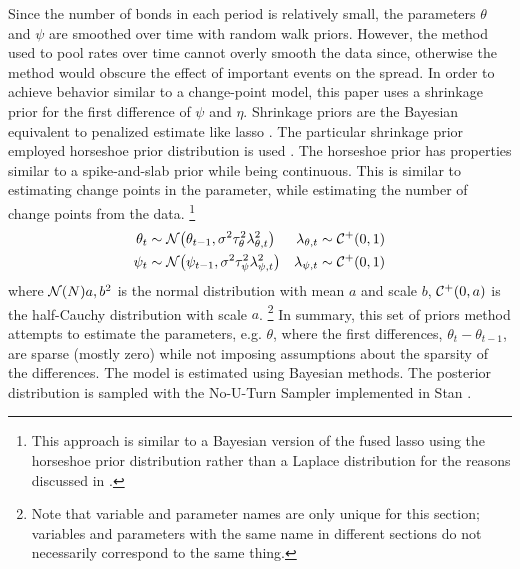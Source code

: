 Since the number of bonds in each period is relatively small, the parameters $\theta$ and $\psi$ are smoothed over time with random walk priors.
However, the method used to pool rates over time cannot overly smooth the data since, otherwise the method would obscure the effect of important events on the spread.
In order to achieve behavior similar to a change-point model, this paper uses a shrinkage prior for the first difference of $\psi$ and $\eta$.
Shrinkage priors are the Bayesian equivalent to penalized estimate like lasso \parencites{Tibshirani1996}{ParkCasella2008}.
The particular shrinkage prior employed horseshoe prior distribution is used \parencites{CarvalhoPolsonScott2009}{CarvalhoPolsonScott2009}.
The horseshoe prior has properties similar to a spike-and-slab prior while being continuous.
This is similar to estimating change points in the parameter, while estimating the number of change points from the data.
\footnote{This approach is similar to a Bayesian version of the fused lasso \textcite{TibshiraniEtAl2005} using the horseshoe prior distribution rather than a Laplace distribution for the reasons discussed in \parencites{CarvalhoPolsonScott2009}{CarvalhoPolsonScott2009}.}
\begin{align}
  \theta_{t} & \sim \mathcal{N}\mathopen{}\left(\theta_{t-1}, \sigma^{2} \tau_{\theta}^{2} \lambda_{\theta,t}^{2}\right)\mathclose{}
  & \lambda_{\theta,t} & \sim \mathcal{C^+}\mathopen{}\left(0, 1\right)\mathclose{} \\
  \psi_{t} & \sim \mathcal{N}\mathopen{}\left(\psi_{t-1}, \sigma^{2} \tau_{\psi}^{2} \lambda_{\psi,t}^{2}\right)\mathclose{}
  & \lambda_{\psi,t} & \sim \mathcal{C^+}\mathopen{}\left(0, 1\right)\mathclose{}
\end{align}
where $\mathcal{N}\mathopen{}\left(N\right)\mathclose{}{a, b^{2}}$ is the normal distribution with mean $a$ and scale $b$, $\mathcal{C^+}\mathopen{}\left(0, a\right)\mathclose{}$ is the half-Cauchy distribution with scale $a$.%
\footnote{Note that variable and parameter names are only unique for this section; variables and parameters with the same name in different sections do not necessarily correspond to the same thing.}
In summary, this set of priors method attempts to estimate the parameters, e.g. $\theta$, where the first differences, $\theta_{t} - \theta_{t-1}$, are sparse (mostly zero) while not imposing assumptions about the sparsity of the differences.
The model is estimated using Bayesian methods.
The posterior distribution is sampled with the No-U-Turn Sampler implemented in Stan \parencites{Stan2015a}{HoffmanGelman2014a}.

